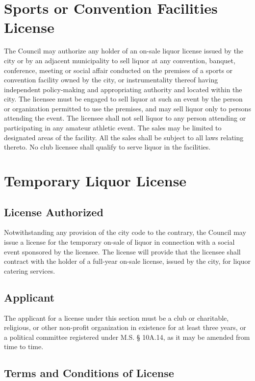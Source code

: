 \section{Sports or Convention Facilities License}
The Council may authorize any holder of an on-sale liquor license issued by the city or by an adjacent municipality to sell liquor at any convention, banquet, conference, meeting or social affair conducted on the premises of a sports or convention facility owned by the city, or instrumentality thereof having independent policy-making and appropriating authority and located within the city.  The licensee must be engaged to sell liquor at such an event by the person or organization permitted to use the premises, and may sell liquor only to persons attending the event.  The licensee shall not sell liquor to any person attending or participating in any amateur athletic event.  The sales may be limited to designated areas of the facility.  All the sales shall be subject to all laws relating thereto.  No club licensee shall qualify to serve liquor in the facilities.

\section{Temporary Liquor License}
\subsection{License Authorized}
Notwithstanding any provision of the city code to the contrary, the Council may issue a license for the temporary on-sale of liquor in connection with a social event sponsored by the licensee.  The license will provide that the licensee shall contract with the holder of a full-year on-sale license, issued by the city, for liquor catering services.
\subsection{Applicant}
The applicant for a license under this section must be a club or charitable, religious, or other non-profit organization in existence for at least three years, or a political committee registered under M.S. § 10A.14, as it may be amended from time to time.
\subsection{Terms and Conditions of License}
